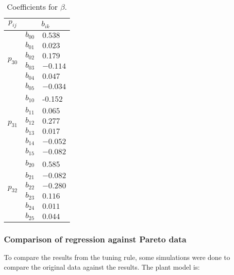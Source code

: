 %
\begin{table}[tb]
	\centering
	\caption{Coefficients for $\beta$.}
	\label{T:beta}
	\begin{tabular}{@{}cll}
		\hline
		$p_{ij}$                  & \multicolumn{2}{c}{$b_{ik}$}  \\
		\hline
		\multirow{6}{*}{$p_{30}$} & $b_{00}$  & $0.538$
		
		\\ %
		& $b_{01}$      & $0.023$     \\ %
		& $b_{02}$      & $0.179$   	\\ %
		& $b_{03}$      & $-0.114$    \\ %
		& $b_{04}$      & $0.047$   	  \\ %
		& $b_{05}$      & $-0.034$   \\ \hline
		\multirow{6}{*}{$p_{31}$} & $b_{10}$  & -0.152
		\\ %
		& $b_{11}$      & $0.065$    \\ %
		& $b_{12}$      & $0.277$      \\ %
		& $b_{13}$      & $0.017$      \\ %
		& $b_{14}$      & $-0.052$   \\ %
		& $b_{15}$      & $-0.082$     \\ \hline
		
		\multirow{6}{*}{$p_{32}$} & $b_{20}$  & 0.585
		\\ %
		& $b_{21}$      & $-0.082$    \\ %
		& $b_{22}$      & $-0.280$      \\ %
		& $b_{23}$      & $0.116$      \\ %
		& $b_{24}$      & $0.011$   \\ %
		& $b_{25}$      & $0.044$     \\ \hline
	\end{tabular}
\end{table}
%
\subsubsection{Comparison of regression against Pareto data}
%
To compare the results from the tuning rule, some simulations were done to compare the original data against the results. The plant model is: 

